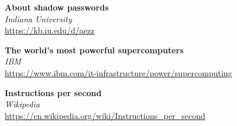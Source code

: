 \documentclass[10pt,a4paper]{article}
\begin{document}
\begin{thebibliography}{9}
 	\textbf{About shadow passwords}\\
 	\textit{Indiana University}\\
 	\url{https://kb.iu.edu/d/aezz}
 	
 	\textbf{The world’s most powerful supercomputers}\\
 	\textit{IBM}\\
 	\url{https://www.ibm.com/it-infrastructure/power/supercomputing}
 
	\textbf{Instructions per second}\\
	\textit{Wikipedia}\\
 	\url{https://en.wikipedia.org/wiki/Instructions_per_second}
 
\end{thebibliography}
\end{document}
